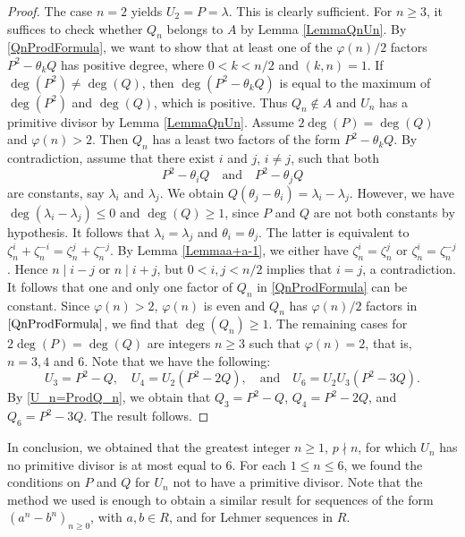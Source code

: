 \documentclass[reqno]{amsart}
\begin{document}
\begin{proof}
    The case $n=2$ yields $U_2=P=\lambda$. This is clearly sufficient. For $n\geq 3$, it suffices to check whether $Q_n$ belongs to $A$ by Lemma \ref{LemmaQnUn}. By \eqref{QnProdFormula}, we want to show that at least one of the $\varphi(n)/2$ factors $P^2-\theta_kQ$ has positive degree, where $0<k<n/2$ and $(k,n)=1$. If $\deg(P^2)\ne \deg(Q)$, then $\deg(P^2-\theta_kQ)$ is equal to the maximum of $\deg(P^2)$ and $\deg(Q)$, which is positive. Thus $Q_n\not \in A$ and $U_n$ has a primitive divisor by Lemma \ref{LemmaQnUn}. Assume $2\deg{(P)}= \deg{(Q)}$ and $\varphi(n)>2$. Then $Q_n$ has a least two factors of the form $P^2-\theta_k Q$. By contradiction, assume that there exist $i$ and $j$, $i\ne j$, such that both
    \[
    P^2-\theta_iQ \quad \text{and} \quad P^2-\theta_jQ
    \]
    are constants, say $\lambda_i$ and $\lambda_j$. We obtain $Q(\theta_j-\theta_i)=\lambda_i-\lambda_j$. However, we have $\deg(\lambda_i-\lambda_j)\leq 0$ and $\deg(Q)\geq 1$, since $P$ and $Q$ are not both constants by hypothesis. It follows that $\lambda_i=\lambda_j$ and $\theta_i=\theta_j$. The latter is equivalent to $\zeta_n^i+\zeta_n^{-i} = \zeta_n^j+\zeta_n^{-j}$. By Lemma \ref{Lemmaa+a-1}, we either have $\zeta_n^i=\zeta_n^j$ or $\zeta_n^i=\zeta_n^{-j}$. Hence $n\mid i-j$ or $n\mid i+j$, but $0<i,j<n/2$ implies that $i=j$, a contradiction. It follows that one and only one factor of $Q_n$ in \eqref{QnProdFormula} can be constant. Since $\varphi(n)>2$, $\varphi(n)$ is even and $Q_n$ has $\varphi(n)/2$ factors in $\eqref{QnProdFormula}$, we find that $\deg(Q_n)\geq 1$. The remaining cases for $2\deg{(P)}= \deg{(Q)}$ are integers $n\geq 3$ such that $\varphi(n)=2$, that is, $n=3,4$ and $6$. Note that we have the following:
    \[
    U_3=P^2-Q, \quad U_4=U_2(P^2-2Q), \quad \text{and} \quad U_6=U_2U_3(P^2-3Q).
    \]
    By \eqref{U_n=ProdQ_n}, we obtain that $Q_3=P^2-Q$, $Q_4=P^2-2Q$, and $Q_6=P^2-3Q$. The result follows.
\end{proof}



In conclusion, we obtained that the greatest integer $n\geq 1$, $p\nmid n$, for which $U_n$ has no primitive divisor is at most equal to $6$. For each $1\leq n \leq 6$, we found the conditions on $P$ and $Q$ for $U_n$ not to have
a primitive divisor. Note that the method we used is enough to obtain a similar result for sequences of the form $(a^n-b^n)_{n\geq 0}$, with $a,b\in R$, and for Lehmer sequences in $R$.
\end{document}
